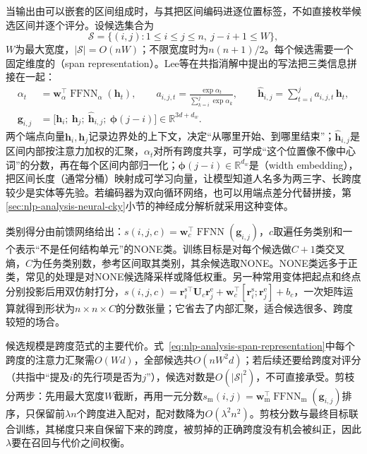 当输出由可以嵌套的区间组成时，与其把区间编码进逐位置标签，不如直接枚举候选区间并逐个评分。设候选集合为
\[
  \mathcal S=\{(i,j):1\leq i\leq j\leq n,\ j-i+1\leq W\},
\]
$W$为最大宽度，$|\mathcal S|=O(nW)$；不限宽度时为$n(n+1)/2$。每个候选需要一个固定维度的（span representation）。Lee等在共指消解中提出的写法把三类信息拼接在一起：
\begin{equation}
  \begin{aligned}
    \alpha_t&=\bm w_\alpha^\top\operatorname{FFNN}_\alpha(\bm h_t),\qquad
    a_{i,j,t}=\frac{\exp\alpha_t}{\sum_{k=i}^{j}\exp\alpha_k},\qquad
    \hat{\bm h}_{i,j}=\sum_{t=i}^{j}a_{i,j,t}\,\bm h_t,\\
    \bm g_{i,j}&=\bigl[\bm h_i;\ \bm h_j;\ \hat{\bm h}_{i,j};\ \bm\phi(j-i)\bigr]\in\mathbb R^{3d+d_w}.
  \end{aligned}
  \label{eq:nlp-analysis-span-representation}
\end{equation}
两个端点向量$\bm h_i,\bm h_j$记录边界处的上下文，决定“从哪里开始、到哪里结束”；$\hat{\bm h}_{i,j}$是区间内部按注意力加权的汇聚，$\alpha_t$对所有跨度共享，可学成“这个位置像不像中心词”的分数，再在每个区间内部归一化；$\bm\phi(j-i)\in\mathbb R^{d_w}$是（width embedding），把区间长度（通常分桶）映射成可学习向量，让模型知道人名多为两三字、长跨度较少是实体等先验。若编码器为双向循环网络，也可以用端点差分代替拼接，第\ref{sec:nlp-analysis-neural-cky}小节的神经成分解析就采用这种变体。

类别得分由前馈网络给出：$s(i,j,c)=\bm w_c^\top\operatorname{FFNN}(\bm g_{i,j})$，$c$取遍任务类别和一个表示“不是任何结构单元”的NONE类。训练目标是对每个候选做$C+1$类交叉熵，$C$为任务类别数，参考区间取其类别，其余候选取NONE。NONE类远多于正类，常见的处理是对NONE候选降采样或降低权重。另一种常用变体把起点和终点分别投影后用双仿射打分，$s(i,j,c)=\bm r_i^{\mathrm s\top}\bm U_c\bm r_j^{\mathrm e}+\bm w_c^\top[\bm r_i^{\mathrm s};\bm r_j^{\mathrm e}]+b_c$，一次矩阵运算就得到形状为$n\times n\times C$的分数张量；它省去了内部汇聚，适合候选很多、跨度较短的场合。

候选规模是跨度范式的主要代价。式~\eqref{eq:nlp-analysis-span-representation}中每个跨度的注意力汇聚需$O(Wd)$，全部候选共$O(nW^2d)$；若后续还要给跨度对评分（共指中“提及$i$的先行项是否为$j$”），候选对数是$O(|\mathcal S|^2)$，不可直接承受。剪枝分两步：先用最大宽度$W$截断，再用一元分数$s_{\mathrm m}(i,j)=\bm w_{\mathrm m}^\top\operatorname{FFNN}_{\mathrm m}(\bm g_{i,j})$排序，只保留前$\lambda n$个跨度进入配对，配对数降为$O(\lambda^2n^2)$。剪枝分数与最终目标联合训练，其梯度只来自保留下来的跨度，被剪掉的正确跨度没有机会被纠正，因此$\lambda$要在召回与代价之间权衡。

